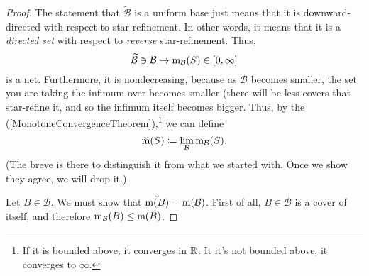 \begin{thm}
\begin{proof}
The statement that $\widetilde{\mathcal{B}}$ is a uniform base just means that it is downward-directed with respect to star-refinement.  In other words, it means that it is a \emph{directed set} with respect to \emph{reverse} star-refinement.  Thus,
\begin{equation}
\widetilde{\mathcal{B}}\ni \mathcal{B}\mapsto \mathrm{m} _{\mathcal{B}}(S)\in [0,\infty ]
\end{equation}
is a net.  Furthermore, it is nondecreasing, because as $\mathcal{B}$ becomes smaller, the set you are taking the infimum over becomes smaller (there will be less covers that star-refine it, and so the infimum itself becomes bigger.  Thus, by the  (\cref{MonotoneConvergenceTheorem}),\footnote{If it is bounded above, it converges in $\mathbb{R}$.  It it's not bounded above, it converges to $\infty$.}  we can define
\begin{equation}
\breve{\mathrm{m}}(S)\coloneqq \lim _{\mathcal{B}}\mathrm{m} _{\mathcal{B}}(S).
\end{equation}
(The breve is there to distinguish it from what we started with.  Once we show they agree, we will drop it.)

Let $B\in \mathcal{B}$.  We must show that $\breve{\mathrm{m} (B)}=\mathrm{m}(\mathcal{B})$.  First of all, $B\in \mathcal{B}$ is a cover of itself, and therefore $\mathrm{m} _{\mathcal{B}}(B)\leq \mathrm{m} (B)$.
\end{proof}
\end{thm}
